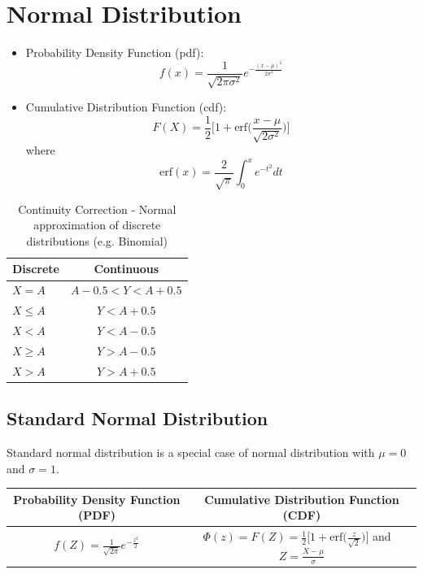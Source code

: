 \documentclass{article}
\begin{document}

\section{Normal Distribution}

\begin{minipage}{0.7\textwidth}
\begin{itemize}
    \item Probability Density Function (pdf):\[f(x) = \frac{1}{\sqrt{2\pi \sigma^{2}}}e^{-\frac{(x-\mu)^{2}}{2\sigma^{2}}}\]
    \item Cumulative Distribution Function (cdf): \[F(X) = \frac{1}{2}\bigg[ 1+ \text{erf}\bigg( \frac{x-\mu}{\sqrt{2\sigma^{2}}} \bigg) \bigg]\]
    where \[\text{erf}(x) = \frac{2}{\sqrt{\pi}} \int_{0}^{x} e^{-t^{2}}dt\]
\end{itemize}
\end{minipage}\hfill
\begin{minipage}{0.3\textwidth}
\begin{table}[H]
    \centering
    \begin{tabular}{l c}\hline
        Discrete & Continuous \\ \hline
        $X=A$ & $A-0.5 < Y < A+0.5$\\ 
        $X\leq A$ & $Y<A+0.5$\\ 
        $X<A$ & $Y<A-0.5$ \\
        $X\geq A$ & $Y>A-0.5$ \\
        $X>A$ & $Y>A+0.5$ \\
    \end{tabular}\caption{Continuity Correction - Normal approximation of discrete distributions (e.g. Binomial)}
\end{table}
\end{minipage}

\subsection*{Standard Normal Distribution}
Standard normal distribution is a special case of normal distribution with $\mu = 0$ and $\sigma =1$.
\begin{table}[H]
    \centering
    \begin{tabular}{c|c}
        Probability Density Function (PDF) &  
        Cumulative Distribution Function (CDF)\\ \hline
        $\displaystyle f(Z) = \frac{1}{\sqrt{2\pi }}e^{-\frac{z^{2}}{2}}$ & 
        $\displaystyle \Phi(z) = F(Z) = \frac{1}{2}\bigg[ 1+ \text{erf}\bigg( \frac{z}{\sqrt{2}} \bigg) \bigg]$ and \ $\displaystyle Z = \frac{X-\mu}{\sigma}$
    \end{tabular}
\end{table}
\end{document}
